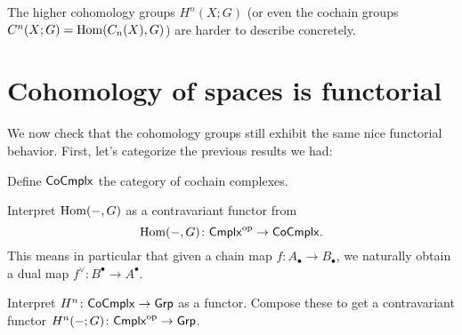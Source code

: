 The higher cohomology groups $H^n(X; G)$
(or even the cochain groups $C^n(X; G) = \operatorname{Hom}(C_n(X), G)$) are harder to describe concretely.

\section{Cohomology of spaces is functorial}
We now check that the cohomology groups still exhibit the same nice functorial behavior.
First, let's categorize the previous results we had:

\begin{ques}
	Define $\mathsf{CoCmplx}$
	the category of cochain complexes.
\end{ques}

\begin{exercise}
	Interpret $\operatorname{Hom}(-,G)$ as a contravariant functor
	from \[ \operatorname{Hom}(-,G) \colon \mathsf{Cmplx}^{\mathrm{op}} \to \mathsf{CoCmplx}. \]
	This means in particular that given a chain map $f \colon A_\bullet \to B_\bullet$,
	we naturally obtain a dual map $f^\vee \colon B^\bullet \to A^\bullet$.
\end{exercise}

\begin{ques}
	Interpret $H^n \colon \mathsf{CoCmplx} \to \mathsf{Grp}$ as a functor.
	Compose these to get a contravariant functor
	$H^n(-;G) \colon \mathsf{Cmplx}^{\mathrm{op}} \to \mathsf{Grp}$.
\end{ques}

